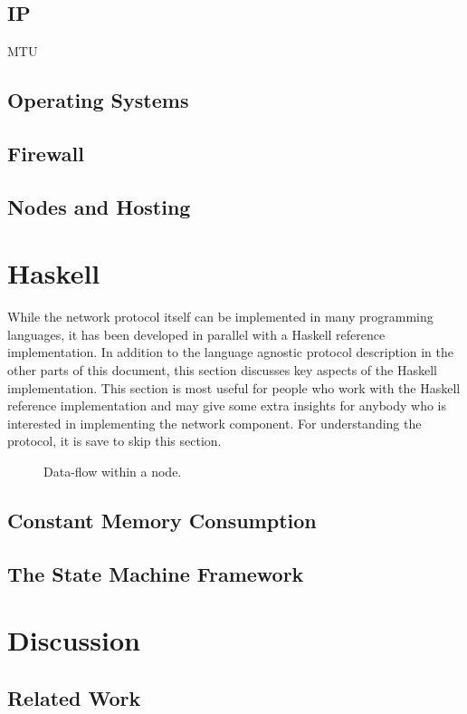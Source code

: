 \documentclass{report}
\theoremstyle{definition}{
  \newtheorem{lemma}{Lemma}[section] %
  \newtheorem{definition}[lemma]{Definition}
}
\theoremstyle{theorem}{
  \newtheorem{invariant}[lemma]{Invariant}
  \newtheorem{proofobligation}[lemma]{Proof Obligation}
}
\numberwithin{equation}{lemma}
\begin{document}
\section{IP}
MTU
\section{Operating Systems}
\section{Firewall}
\section{Nodes and Hosting}

\chapter{Haskell}
While the network protocol itself can be implemented in many programming languages,
it has been developed in parallel with a Haskell reference implementation.
In addition to the language agnostic protocol description in the other parts of this document,
this section discusses key aspects of the Haskell implementation.
This section is most useful for people who work with the Haskell reference implementation and
may give some extra insights for anybody who is interested in implementing the
network component.
For understanding the protocol, it is save to skip this section.
\begin{figure}
\begin{center}
\end{center}
\caption{Data-flow within a node.}
\label{node-diagram-concurrency}
\end{figure}
\section{Constant Memory Consumption}
\section{The State Machine Framework}
\label{Haskell-state-machine}

\chapter{Discussion}
\section{Related Work}
\end{document}
